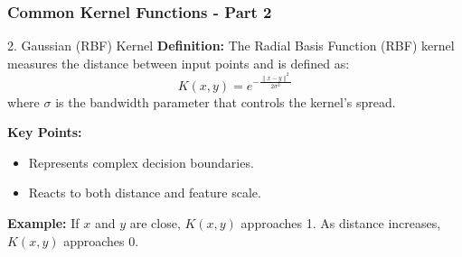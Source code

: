\documentclass{beamer}
\begin{document}
\begin{frame}[fragile]
    \frametitle{Common Kernel Functions - Part 2}
    \begin{block}{2. Gaussian (RBF) Kernel}
        \textbf{Definition:}
        The Radial Basis Function (RBF) kernel measures the distance between input points and is defined as:
        \begin{equation}
        K(x, y) = e^{-\frac{\| x - y \|^2}{2\sigma^2}}
        \end{equation}
        where \( \sigma \) is the bandwidth parameter that controls the kernel's spread.
        
        \textbf{Key Points:}
        \begin{itemize}
            \item Represents complex decision boundaries.
            \item Reacts to both distance and feature scale.
        \end{itemize}
        
        \textbf{Example:}
        If \( x \) and \( y \) are close, \( K(x, y) \) approaches 1. As distance increases, \( K(x, y) \) approaches 0.
    \end{block}
\end{frame}
\end{document}
